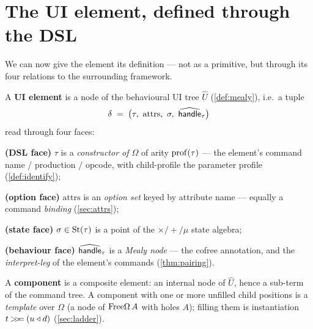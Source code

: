 \documentclass[../uxoxo-main]{subfiles}
\begin{document}

\section{The UI element, defined through the DSL}\label{sec:element}
We can now give the element its definition --- not as a primitive, but through its
four relations to the surrounding framework.

\begin{definition}\label{def:element}
A \textbf{UI element} is a node of the behavioural UI tree $\widehat U$
(\cref{def:mealy}), i.e.\ a tuple
\[
  \delta \;=\; \bigl(\tau,\ \mathrm{attrs},\ \sigma,\ \widehat{\handle}_\tau\bigr)
\]
read through four faces:
\begin{definitionlist}
  \item \textbf{(DSL face)} $\tau$ is a \emph{constructor of $\Omega$} of arity
        $\mathrm{prof}(\tau)$ --- the element's command name / production / opcode, with
        child-profile the parameter profile (\cref{def:identify});
  \item \textbf{(option face)} $\mathrm{attrs}$ is an \emph{option set} keyed by
        attribute name --- equally a command \emph{binding} (\cref{sec:attrs});
  \item \textbf{(state face)} $\sigma\in\mathrm{St}(\tau)$ is a point of the $\times/+/\mu$
        state algebra;
  \item \textbf{(behaviour face)} $\widehat{\mathsf{handle}}_\tau$ is a \emph{Mealy node}
        --- the cofree annotation, and the \emph{interpret-leg} of the element's
        commands (\cref{thm:pairing}).
\end{definitionlist}
A \textbf{component} is a composite element: an internal node of $\widehat U$,
hence a sub-term of the command tree. A component with one or more unfilled child
positions is a \emph{template} over $\Omega$ (a node of $\mathrm{Free}\Omega\,A$ with holes
$A$); filling them is instantiation $t\mathbin{>\!\!>\!\!=}(u\mathbin{\triangleleft} d)$ (\cref{sec:ladder}).
\end{definition}
\end{document}
